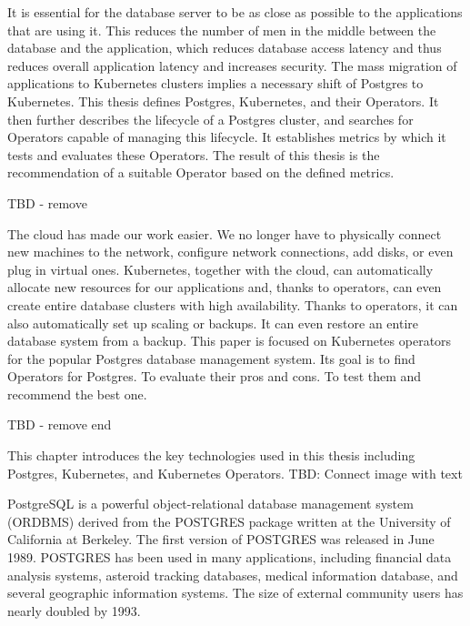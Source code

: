 
It is essential for the database server to be as close as possible to the applications that are using it. This reduces the number of men in the middle between the database and the application, which reduces database access latency and thus reduces overall application latency and increases security. The mass migration of applications to Kubernetes clusters implies a necessary shift of Postgres to Kubernetes. This thesis defines Postgres, Kubernetes, and their Operators. It then further describes the lifecycle of a Postgres cluster, and searches for Operators capable of managing this lifecycle. It establishes metrics by which it tests and evaluates these Operators.  The result of this thesis is the recommendation of a suitable Operator based on the defined metrics.

TBD - remove

The cloud has made our work easier. We no longer have to physically connect new machines to the network, configure network connections, add disks, or even plug in virtual ones. Kubernetes, together with the cloud, can automatically allocate new resources for our applications and, thanks to operators, can even create entire database clusters with high availability. Thanks to operators, it can also automatically set up scaling or backups. It can even restore an entire database system from a backup. This paper is focused on Kubernetes operators for the popular Postgres database management system. Its goal is to find Operators for Postgres. To evaluate their pros and cons. To test them and recommend the best one.

TBD - remove end


This chapter introduces the key technologies used in this thesis including Postgres, Kubernetes, and Kubernetes Operators.
TBD: Connect image with text

PostgreSQL is a powerful object-relational database management system (ORDBMS) derived from the POSTGRES package written at the University of California at Berkeley. \cite{docuPgwhatIsPg} \cite{pg14introduction} The first version of POSTGRES was released in June 1989. POSTGRES has been used in many applications, including financial data analysis systems, asteroid tracking databases, medical information database, and several geographic information systems. The size of external community users has nearly doubled by 1993. \cite{docuPgBriefHistory}

